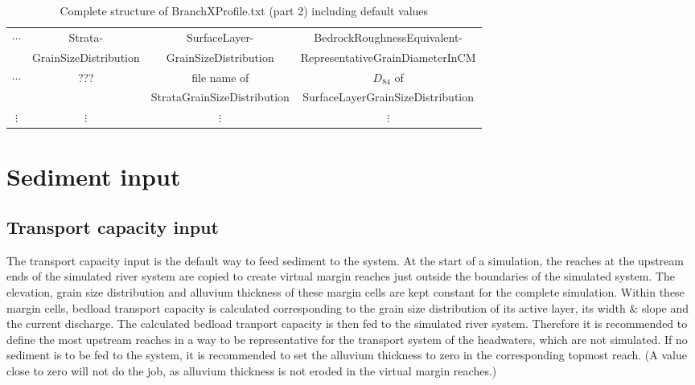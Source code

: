 \documentclass[11pt,a4paper]{article}
\newcommand{\tablefontsize}[0]{\small}
\begin{document}
\begin{table}[h]
\caption{Complete structure of BranchXProfile.txt (part 2) including default values}
\label{CompleteBranchXProfile2}
\vskip4mm
\tablefontsize
\begin{adjustwidth}{-4cm}{-4cm}
\centering
\begin{tabular}{c|c|c|c}
\hline\hline
\multirow{2}{*}{$\cdots$} & Strata- & SurfaceLayer- & BedrockRoughnessEquivalent-\\
 & GrainSizeDistribution & GrainSizeDistribution & RepresentativeGrainDiameterInCM\\
\hline
\multirow{2}{*}{$\cdots$} & \multirow{2}{*}{???} & file name of & $D_{84}$ of\\
 & & StrataGrainSizeDistribution & SurfaceLayerGrainSizeDistribution\\
\hline
$\vdots$ & $\vdots$ & $\vdots$ & $\vdots$\\
\hline\hline
\end{tabular}
\end{adjustwidth}
\end{table}

\section{Sediment input}\label{SedimentInput}
\subsection{Transport capacity input}\label{TransportCapacityInput}
The transport capacity input is the default way to feed sediment to the system. At the start of a simulation, the reaches at the upstream ends of the simulated river system are copied to create virtual margin reaches just outside the boundaries of the simulated system. The elevation, grain size distribution and alluvium thickness of these margin cells are kept constant for the complete simulation. Within these margin cells, bedload transport capacity is calculated corresponding to the grain size distribution of its active layer, its width \&{} slope and the current discharge. The calculated bedload tranport capacity is then fed to the simulated river system. Therefore it is recommended to define the most upstream reaches in a way to be representative for the transport system of the headwaters, which are not simulated. If no sediment is to be fed to the system, it is recommended to set the alluvium thickness to zero in the corresponding topmost reach. (A value close to zero will not do the job, as alluvium thickness is not eroded in the virtual margin reaches.)
\end{document}
